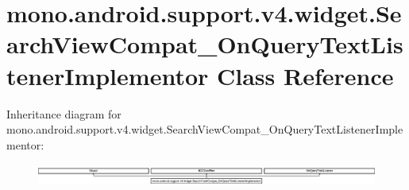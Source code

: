 \hypertarget{classmono_1_1android_1_1support_1_1v4_1_1widget_1_1_search_view_compat___on_query_text_listener_implementor}{}\section{mono.\+android.\+support.\+v4.\+widget.\+Search\+View\+Compat\+\_\+\+On\+Query\+Text\+Listener\+Implementor Class Reference}
\label{classmono_1_1android_1_1support_1_1v4_1_1widget_1_1_search_view_compat___on_query_text_listener_implementor}
Inheritance diagram for mono.\+android.\+support.\+v4.\+widget.\+Search\+View\+Compat\+\_\+\+On\+Query\+Text\+Listener\+Implementor\+:\begin{figure}[H]
\begin{center}
\leavevmode
\includegraphics[height=0.730594cm]{classmono_1_1android_1_1support_1_1v4_1_1widget_1_1_search_view_compat___on_query_text_listener_implementor}
\end{center}
\end{figure}
